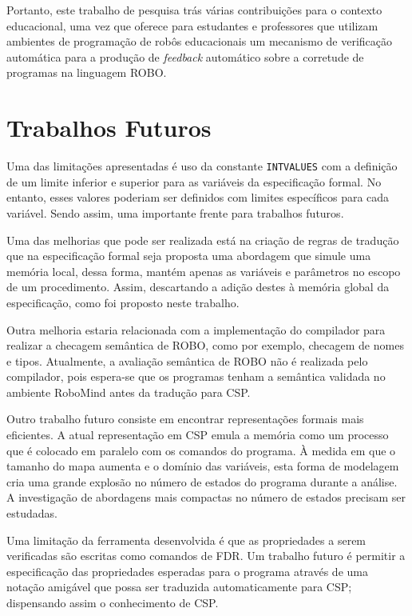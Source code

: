 Portanto, este trabalho de pesquisa trás várias contribuições para o contexto educacional, uma vez que oferece para estudantes e professores que utilizam ambientes de programação de robôs educacionais um mecanismo de verificação automática para a produção de \textit{feedback} automático sobre a corretude de programas na linguagem ROBO. 


\section{Trabalhos Futuros}

Uma das limitações apresentadas é uso da constante \texttt{INTVALUES} com a definição de um limite inferior e superior para as variáveis da especificação formal. No entanto, esses valores poderiam ser definidos com limites específicos para cada variável. Sendo assim, uma importante frente para trabalhos futuros.

Uma das melhorias que pode ser realizada está na criação de regras de tradução que na especificação formal seja proposta uma abordagem que simule uma memória local, dessa forma, mantém apenas as variáveis e parâmetros no escopo de um procedimento. Assim, descartando a adição destes à memória global da especificação, como foi proposto neste trabalho.

Outra melhoria estaria relacionada com a implementação do compilador para realizar a checagem semântica de ROBO, como por exemplo, checagem de nomes e tipos. Atualmente, a avaliação semântica de ROBO não é realizada pelo compilador, pois espera-se que os programas tenham a semântica validada no ambiente RoboMind antes da tradução para CSP.

Outro trabalho futuro consiste em encontrar representações formais mais eficientes. A atual representação em CSP emula a memória como um processo que é colocado em paralelo com os comandos do programa. À medida em que o tamanho do mapa aumenta e o domínio das variáveis, esta forma de modelagem cria uma grande explosão no número de estados do programa durante a análise. A investigação de abordagens mais compactas no número de estados precisam ser estudadas.

Uma limitação da ferramenta desenvolvida é que as propriedades a serem verificadas são escritas como comandos de FDR. Um trabalho futuro é permitir a especificação das propriedades esperadas para o programa através de uma notação amigável que possa ser traduzida automaticamente para CSP; dispensando assim o conhecimento de CSP.
